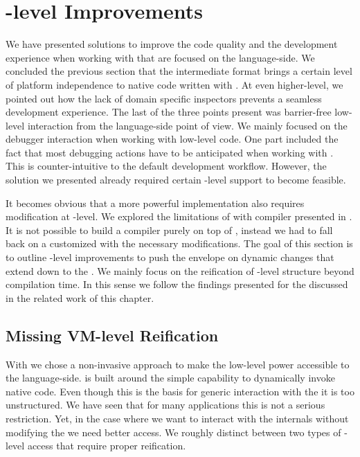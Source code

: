 \section{\VM-level Improvements}
We have presented solutions to improve the code quality and the development experience when working with \B that are focused on the language-side.
We concluded the previous section that the \VCPU intermediate format brings a certain level of platform independence to native code written with \B.
At even higher-level, we pointed out how the lack of domain specific inspectors prevents a seamless development experience.
The last of the three points present was barrier-free low-level interaction from the language-side point of view.
We mainly focused on the debugger interaction when working with low-level \B code.
One part included the fact that most debugging actions have to be anticipated when working with \B.
This is counter-intuitive to the default \PH development workflow.
However, the solution we presented already required certain \VM-level support to become feasible.

It becomes obvious that a more powerful \B implementation also requires modification at \VM-level.
We explored the limitations of \B with \NBJ \JIT compiler presented in .
It is not possible to build a \JIT compiler purely on top of \B, instead we had to fall back on a customized \VM with the necessary modifications.
The goal of this section is to outline \VM-level improvements to push the envelope on dynamic changes that extend down to the \VM.
We mainly focus on the reification of \VM-level structure beyond compilation time.
In this sense we follow the findings presented for the \Klein \VM discussed in the related work  of this chapter.


\subsection{Missing VM-level Reification}
With \B we chose a non-invasive approach to make the low-level power accessible to the language-side.
\B is built around the simple capability to dynamically invoke native code.
Even though this is the basis for generic interaction with the \VM it is too unstructured.
We have seen that for many \B applications this is not a serious restriction.
Yet, in the case where we want to interact with the \VM internals without modifying the \VM we need better access.
We roughly distinct between two types of \VM-level access that require proper reification. 

